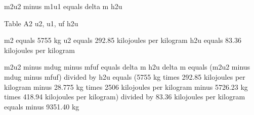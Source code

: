m2u2 minus m1u1 equals delta m h2u

Table A2  
u2, u1, uf  
h2u

m2 equals 5755 kg  
u2 equals 292.85 kilojoules per kilogram  
h2u equals 83.36 kilojoules per kilogram  

m2u2 minus mdug minus mfuf equals delta m h2u  
delta m equals (m2u2 minus mdug minus mfuf) divided by h2u  
equals (5755 kg times 292.85 kilojoules per kilogram minus 28.775 kg times 2506 kilojoules per kilogram minus 5726.23 kg times 418.94 kilojoules per kilogram) divided by 83.36 kilojoules per kilogram  
equals minus 9351.40 kg